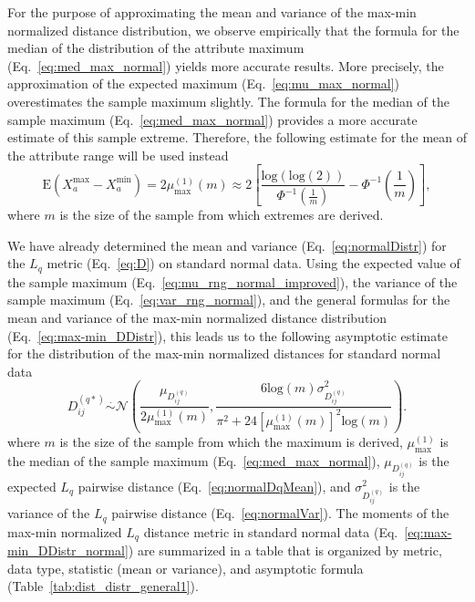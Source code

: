 \documentclass[aos]{imsart}
\begin{document}
For the purpose of approximating the mean and variance of the max-min normalized distance distribution, we observe empirically that the formula for the median of the distribution of the attribute maximum (Eq.~\ref{eq:med_max_normal}) yields more accurate results. More precisely, the approximation of the expected maximum (Eq.~\ref{eq:mu_max_normal}) overestimates the sample maximum slightly. The formula for the median of the sample maximum (Eq.~\ref{eq:med_max_normal}) provides a more accurate estimate of this sample extreme. Therefore, the following estimate for the mean of the attribute range will be used instead
%
\begin{equation}\label{eq:mu_rng_normal_improved}
\text{E}(X^\text{max}_a - X^\text{min}_a) = 2\mu^{(1)}_\text{max}(m) \approx 2\left[\frac{\text{log}(\text{log}(2))}{\Phi^{-1}\left(\frac{1}{m}\right)} - \Phi^{-1}\left(\frac{1}{m}\right)\right],
\end{equation}
%
where $m$ is the size of the sample from which extremes are derived.

We have already determined the mean and variance (Eq.~\ref{eq:normalDistr}) for the $L_q$ metric (Eq.~\ref{eq:D}) on standard normal data. Using the expected value of the sample maximum (Eq.~\ref{eq:mu_rng_normal_improved}), the variance of the sample maximum (Eq.~\ref{eq:var_rng_normal}), and the general formulas for the mean and variance of the max-min normalized distance distribution (Eq.~\ref{eq:max-min_DDistr}), this leads us to the following asymptotic estimate for the distribution of the max-min normalized distances for standard normal data
%
\begin{equation}\label{eq:max-min_DDistr_normal}
D^{(q*)}_{ij} \overset{.}{\sim} \mathcal{N}\left(\frac{\mu_{D^{(q)}_{ij}}}{2\mu^{(1)}_\text{max}(m)}, \frac{6 \text{log}(m) \sigma^2_{D^{(q)}_{ij}}}{\pi^2 + 24 \left[\mu^{(1)}_\text{max}(m)\right]^2 \text{log}(m)}\right).
\end{equation}
%
where $m$ is the size of the sample from which the maximum is derived, $\mu^{(1)}_\text{max}$ is the median of the sample maximum (Eq.~\ref{eq:med_max_normal}), $\mu_{D^{(q)}_{ij}}$ is the expected $L_q$ pairwise distance (Eq.~\ref{eq:normalDqMean}), and $\sigma^2_{D^{(q)}_{ij}}$ is the variance of the $L_q$ pairwise distance (Eq.~\ref{eq:normalVar}). The moments of the max-min normalized $L_q$ distance metric in standard normal data (Eq.~\ref{eq:max-min_DDistr_normal}) are summarized in a table that is organized by metric, data type, statistic (mean or variance), and asymptotic formula (Table~\ref{tab:dist_distr_general1}).
\end{document}
